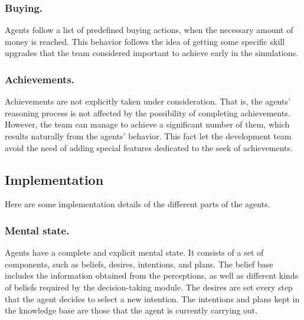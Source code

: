 \documentclass{llncs2e/llncs}
\begin{document}
\subsubsection{Buying.}

    Agents follow a list of predefined buying actions, when the necessary amount 
    of money is reached. This behavior follows the idea of getting some specific skill 
    upgrades that the team considered important to achieve early in the simulations.
    

\subsubsection{Achievements.}

    Achievements are not explicitly taken under consideration. That is, the agents'
    reasoning process is not affected by the possibility of completing achievements.    
    However, the team can manage to achieve a significant number of them, which 
    results naturally from the agents' behavior. 
    This fact let the development team avoid the need of adding special features 
    dedicated to the seek of achievements.
    
\subsection{Implementation}

    Here are some implementation details of the different parts of the agents.
    
\subsubsection{Mental state.}

    Agents have a complete and explicit mental state. It consists of a set of 
    components, such as beliefs, desires, intentions, and plans. 
    The belief base includes the information obtained from the perceptions, as
    well as different kinds of beliefs required by the decision-taking module.
    The desires are set every step that the agent decides to select a new intention.
    The intentions and plans kept in the knowledge base are those that the agent
    is currently carrying out.
    
\end{document}

